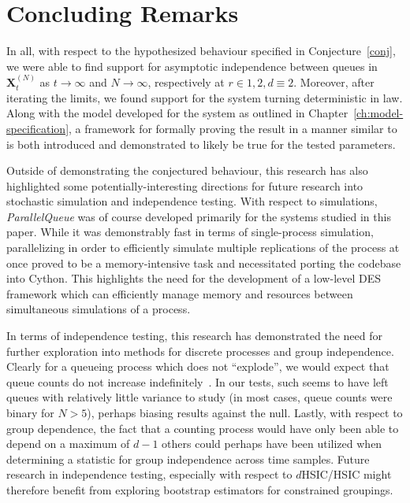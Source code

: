 
\chapter{Concluding Remarks}\label{ch:discussion}

In all, with respect to the hypothesized behaviour specified in Conjecture~\ref{conj}, we were able to find support for asymptotic independence between queues in
$\mathbf{X}^{(N)}_{t}$ as $t\rightarrow \infty$ and $N\rightarrow \infty$, respectively at $r \in {1,2}, d \equiv 2$.
Moreover, after iterating the limits, we found support for the system turning deterministic in law.
Along with the model developed for the system as outlined in Chapter~\ref{ch:model-specification}, a framework for formally proving the result in a manner similar to~\cite{bramson_asymptotic_2012}
is both introduced and demonstrated to likely be true for the tested parameters.

Outside of demonstrating the conjectured behaviour, this research has also highlighted some potentially-interesting directions
for future research into stochastic simulation and independence testing. 
With respect to simulations, \textit{ParallelQueue} was of course developed primarily for the systems studied in this paper.
While it was demonstrably fast in terms of single-process simulation, parallelizing in order to efficiently simulate multiple replications of the process
at once proved to be a memory-intensive task and necessitated porting the codebase into Cython.
This highlights the need for the development of a low-level DES framework which can efficiently manage memory and resources between simultaneous simulations of a process.

In terms of independence testing, this research has demonstrated the need for further exploration into methods for discrete processes and group independence.
Clearly for a queueing process which does not ``explode'', we would expect that queue counts do not increase indefinitely~\cite{gardner_redundancy-d_2017}.
In our tests, such seems to have left queues with relatively little variance to study (in most cases, queue counts were binary for $N>5$), perhaps biasing results against the null.
Lastly, with respect to group dependence, the fact that a counting process would have only been able to depend on a maximum of $d-1$ others could perhaps have been utilized when determining a statistic for group independence
across time samples.
Future research in independence testing, especially with respect to $d$HSIC/HSIC might therefore benefit from exploring bootstrap estimators for constrained groupings.

